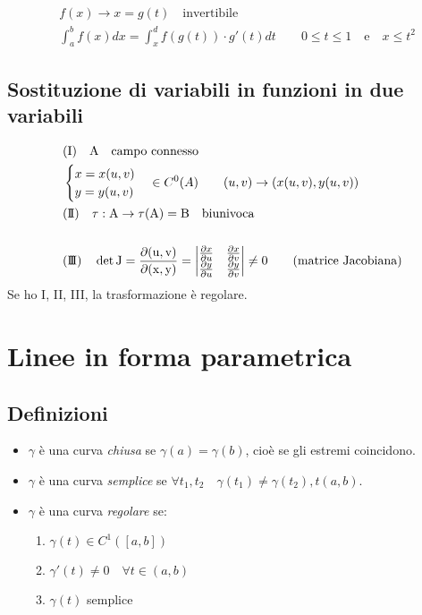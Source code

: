 \documentclass[10pt,a4paper,fleqn]{article}
\begin{document}
	\begin{equation}
	\begin{split}
	&f(x) \longrightarrow x = g(t) \quad \text{invertibile}\\
	&\int_a^b f(x)dx = \int_x^d f(g(t))\cdot g'(t)dt \qquad 0 \leq t \leq 1 \quad\text{e}\quad x \leq t^2
	\end{split}
	\end{equation}

	\subsection{Sostituzione di variabili in funzioni in due variabili}

	\begin{equation}
	\begin{split}
	&(\rm I)\quad A \quad\text{campo connesso}\\
	&\begin{cases}
	x=x(u,v)\\ y=y(u,v)
	\end{cases} \in C^0(A) \qquad (u,v) \rightarrow (x(u,v),y(u,v))\\
	&(\rm I\!I)\quad\tau: A \rightarrow \tau(A)=B \quad\text{biunivoca}\\\\
	&(\rm I\!I\!I)\quad\det J=\frac{\partial(u,v)}{\partial(x,y)} = \begin{vmatrix}
	\frac{\partial x}{\partial u} & \frac{\partial x}{\partial v}\\
	\frac{\partial y}{\partial u} & \frac{\partial y}{\partial v}
	\end{vmatrix} \neq 0 \qquad \text{(matrice Jacobiana)}\\
	\end{split}
	\end{equation}
	Se ho \rm I, \rm I\!I, \rm I\!I\!I, la trasformazione è regolare.
	\section{Linee in forma parametrica}

	\subsection{Definizioni}

	\begin{itemize}
	\item $\gamma$ è una curva \emph{chiusa} se $\gamma(a)=\gamma(b)$, cioè se gli estremi coincidono.
	\item $\gamma$ è una curva \emph{semplice} se $\forall t_1, t_2 \quad \gamma(t_1) \neq \gamma(t_2), t(a,b)$.
	\item $\gamma$ è una curva \emph{regolare} se:
	\begin{enumerate}
		\item $\gamma(t) \in C^1([a,b])$
		\item $\gamma'(t)\neq 0 \quad\forall t \in (a,b)$
		\item $\gamma(t)$ semplice
	\end{enumerate}
	\end{itemize}
\end{document}
